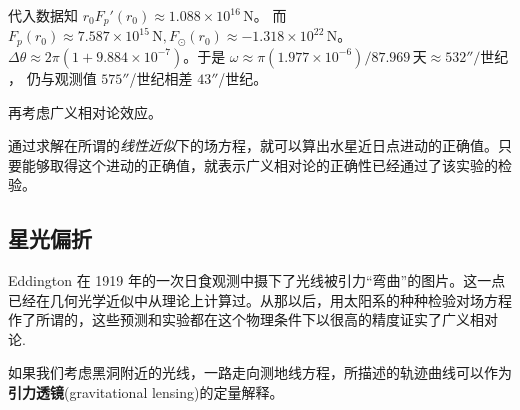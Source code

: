 \begin{table}[htbp]
\centering
{}
\caption{行星数据与计算结果}
\end{table}

代入数据知 $r_0F_p'(r_0)\approx 1.088 \times 10^{16}\,\mathrm{N}$。
而 $F_p(r_0)\approx 7.587 \times 10^{15}\,\mathrm{N}, F_\odot(r_0)\approx -1.318 \times 10^{22}\,\mathrm{N}$。
$\Delta \theta\approx 2\pi(1+9.884\times 10^{-7})$。于是 $\omega\approx{\pi(1.977\times 10^{-6})}/{87.969\,\text{天}}\approx 532''/\text{世纪}$，
仍与观测值 $575''$/世纪相差 $43''$/世纪。

再考虑广义相对论效应。

通过求解在所谓的\textit{线性近似}下的场方程，就可以算出水星近日点进动的正确值。只要能够取得这个进动的正确值，就表示广义相对论的正确性已经通过了该实验的检验。



\subsection{星光偏折}
Eddington 在 1919 年的一次日食观测中摄下了光线被引力“弯曲”的图片。这一点已经在几何光学近似中从理论上计算过。从那以后，用太阳系的种种检验对场方程作了所谓的，这些预测和实验都在这个物理条件下以很高的精度证实了广义相对论.

如果我们考虑黑洞附近的光线，一路走向测地线方程，所描述的轨迹曲线可以作为\textbf{引力透镜}(gravitational lensing)的定量解释。

